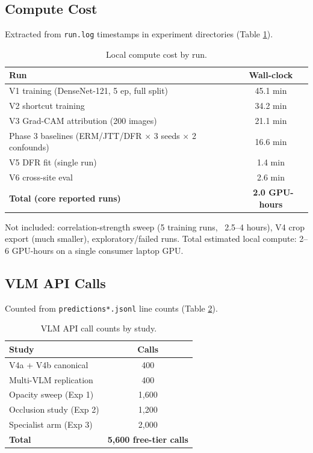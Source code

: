 \documentclass{ieeeaccess}
\begin{document}
\subsection{Compute Cost}
Extracted from \texttt{run.log} timestamps in experiment directories (Table
\ref{tab:compute}).

\begin{table}[h]
\caption{Local compute cost by run.}
\label{tab:compute}
\centering
\small
\begin{tabular}{|p{140pt}|c|}
\hline
Run & Wall-clock \\
\hline
V1 training (DenseNet-121, 5 ep, full split) & 45.1 min \\
V2 shortcut training & 34.2 min \\
V3 Grad-CAM attribution (200 images) & 21.1 min \\
Phase 3 baselines (ERM/JTT/DFR $\times$ 3 seeds $\times$ 2 confounds) & 16.6
min \\
V5 DFR fit (single run) & 1.4 min \\
V6 cross-site eval & 2.6 min \\
\hline
\textbf{Total (core reported runs)} & \textbf{~2.0 GPU-hours} \\
\hline
\end{tabular}
\end{table}

Not included: correlation-strength sweep (5 training runs, ~2.5--4 hours),
V4 crop export (much smaller), exploratory/failed runs. Total estimated
local compute: 2--6 GPU-hours on a single consumer laptop GPU.

\subsection{VLM API Calls}
Counted from \texttt{predictions*.jsonl} line counts (Table \ref{tab:apicalls}).

\begin{table}[h]
\caption{VLM API call counts by study.}
\label{tab:apicalls}
\centering
\small
\begin{tabular}{|l|c|}
\hline
Study & Calls \\
\hline
V4a + V4b canonical & 400 \\
Multi-VLM replication & 400 \\
Opacity sweep (Exp 1) & 1,600 \\
Occlusion study (Exp 2) & 1,200 \\
Specialist arm (Exp 3) & 2,000 \\
\hline
\textbf{Total} & \textbf{5,600 free-tier calls} \\
\hline
\end{tabular}
\end{table}
\end{document}
